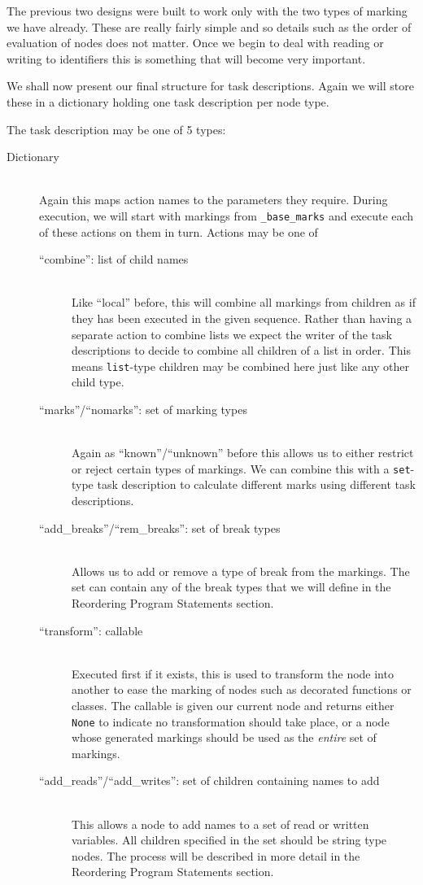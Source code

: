 \documentclass[twoside,a4paper]{report}
\begin{document}
The previous two designs were built to work only with the two types of marking we have already. These are really fairly simple and so details such
as the order of evaluation of nodes does not matter. Once we begin to deal with reading or writing to identifiers this is something that will become
very important.
 
We shall now present our final structure for task descriptions. Again we will store these in a dictionary holding one task description per node type.

The task description may be one of 5 types:

\begin{description}
\item[Dictionary] \hfill \\
Again this maps action names to the parameters they require. During execution, we will start with markings from \texttt{\_base\_marks} and
execute each of these actions on them in turn. Actions may be one of

\begin{description}
  \item[``combine'': list of child names] \hfill \\
  Like ``local'' before, this will combine all markings from children as if they has been executed in the given sequence. Rather than having a
  separate action to combine lists we expect the writer of the task descriptions to decide to combine all children of a list in order. This means \texttt{list}-type
  children may be combined here just like any other child type.
  \item[``marks''/``nomarks'': set of marking types] \hfill \\
  Again as ``known''/``unknown'' before this allows us to either restrict or reject certain types of markings. We can combine this with a \texttt{set}-type task
  description to calculate different marks using different task descriptions.
  \item[``add\_breaks''/``rem\_breaks'': set of break types] \hfill \\
  Allows us to add or remove a type of break from the markings. The set can contain any of the break types that we will define in the Reordering
  Program Statements section.
  \item[``transform'': callable] \hfill \\
  Executed first if it exists, this is used to transform the node into another to ease the marking of nodes such as decorated functions or
  classes. The callable is given our current node and returns either \texttt{None} to indicate no transformation should take place, or a
  node whose generated markings should be used as the \textit{entire} set of markings.
  \item[``add\_reads''/``add\_writes'': set of children containing names to add] \hfill \\
  This allows a node to add names to a set of read or written variables. All children specified in the set should be string type nodes. The process
  will be described in more detail in the Reordering Program Statements section.
\end{description}


\end{description}
\end{document}
